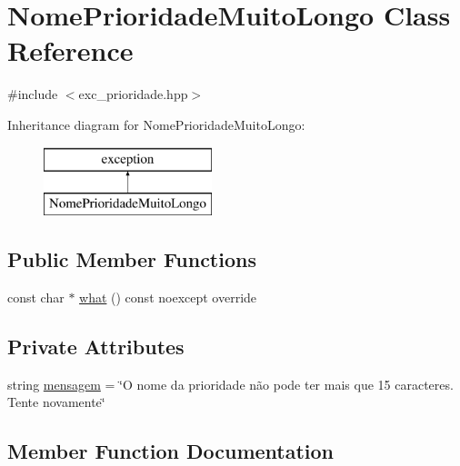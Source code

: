 \hypertarget{classNomePrioridadeMuitoLongo}{}\section{Nome\+Prioridade\+Muito\+Longo Class Reference}
\label{classNomePrioridadeMuitoLongo}


{\ttfamily \#include $<$exc\+\_\+prioridade.\+hpp$>$}

Inheritance diagram for Nome\+Prioridade\+Muito\+Longo\+:\begin{figure}[H]
\begin{center}
\leavevmode
\includegraphics[height=2.000000cm]{classNomePrioridadeMuitoLongo}
\end{center}
\end{figure}
\subsection*{Public Member Functions}
\begin{DoxyCompactItemize}
\item 
const char $\ast$ \hyperlink{classNomePrioridadeMuitoLongo_a47faeee7100e964cb4bd8db518043316}{what} () const noexcept override
\end{DoxyCompactItemize}
\subsection*{Private Attributes}
\begin{DoxyCompactItemize}
\item 
string \hyperlink{classNomePrioridadeMuitoLongo_aa80f887bae3a735020c0113998991345}{mensagem} = \char`\"{}O nome da prioridade não pode ter mais que 15 caracteres. Tente novamente\char`\"{}
\end{DoxyCompactItemize}


\subsection{Member Function Documentation}
\mbox{\label{classNomePrioridadeMuitoLongo_a47faeee7100e964cb4bd8db518043316}} 
